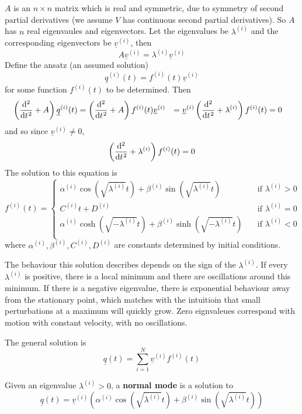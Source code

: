 $A$ is an $n \times n$ matrix which is real and symmetric, due to symmetry of second partial derivatives (we assume $V$ has continuous second partial derivatives). So $A$ has $n$ real eigenvaules and eigenvectors. Let the eigenvalues be $\lambda^{(i)}$ and the corresponding eigenvectors be $\underline{v}^{(i)}$, then
\[
	A \underline{v}^{(i)} = \lambda^{(i)} \underline{v}^{(i)}
\]
Define the ansatz (an assumed solution)
\[
	\underline{q}^{(i)} (t) = f^{(i)} (t) \underline{v}^{(i)}
\]
for some function $f^{(i)} (t)$ to be determined. Then
\[
	\begin{aligned}
		\left( \diff[2]{}{t} + A \right) \underline{q}^{(i)} (t)
			& = \left( \diff[2]{}{t} + A \right) f^{(i)} (t) \underline{v}^{(i)}
			& = \underline{v}^{(i)} \left( \diff[2]{}{t} + \lambda^{(i)} \right) f^{(i)} (t)
			& = 0
	\end{aligned}
\]
and so since $\underline{v}^{(i)} \ne 0$,
\[
	\left( \diff[2]{}{t} + \lambda^{(i)} \right) f^{(i)} (t) = 0
\]
The solution to this equation is
\[
	f^{(i)} (t) = \begin{cases}
		\alpha^{(i)} \cos(\sqrt{\lambda^{(i)}} t) + \beta^{(i)} \sin(\sqrt{\lambda^{(i)}} t) & \quad \text{if } \lambda^{(i)} > 0 \\
		C^{(i)} t + D^{(i)} & \quad \text{if } \lambda^{(i)} = 0 \\
		\alpha^{(i)} \cosh(\sqrt{-\lambda^{(i)}} t) + \beta^{(i)} \sinh(\sqrt{-\lambda^{(i)}} t) & \quad \text{if } \lambda^{(i)} < 0 \\
	\end{cases}
\]
where $\alpha^{(i)}, \beta^{(i)}, C^{(i)}, D^{(i)}$ are constants determined by initial conditions.

The behaviour this solution describes depends on the sign of the $\lambda^{(i)}$. If every $\lambda^{(i)}$ is positive, there is a local minimum and there are oscillations around this minimum. If there is a negative eigenvalue, there is exponential behaviour away from the stationary point, which matches with the intuitioin that small perturbations at a maximum will quickly grow. Zero eignvaleues correspond with motion with constant velocity, with no oscillations.

The general solution is
\[
	\underline{q}(t) = \sum_{i = 1}^{N} \underline{v}^{(i)} f^{(i)} (t)
\]

\begin{definition}
	Given an eigenvalue $\lambda^{(i)} > 0$, a \textbf{normal mode} is a solution to
	\[
		\underline{q}(t) = \underline{v}^{(i)} \left( \alpha^{(i)} \cos(\sqrt{\lambda^{(i)}} t) + \beta^{(i)} \sin(\sqrt{\lambda^{(i)}} t) \right)
	\]
\end{definition}

